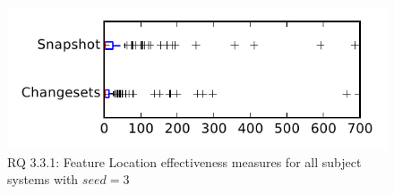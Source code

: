
\begin{figure}
\centering
\includegraphics[height=0.4\textheight]{figures/flt_seed/rq1_tiny_3}
\caption{RQ 3.3.1: Feature Location effectiveness measures for all subject systems with $seed=3$}
\label{fig:flt_seed:rq1:tiny}
\end{figure}
